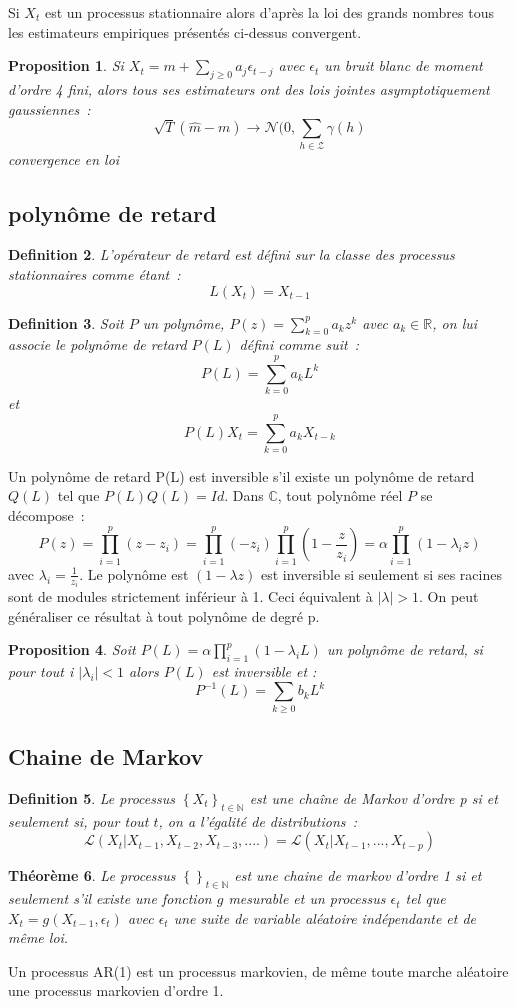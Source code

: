 \documentclass[11pt]{scrartcl} %
\newtheorem{theorem}{Théorème}[section]
\newtheorem{Def}[theorem]{Definition}
\newtheorem{pro}[theorem]{Proposition}
\begin{document}
Si $X_t$ est un processus stationnaire alors d'après la loi des grands nombres tous les estimateurs empiriques présentés ci-dessus convergent.

\begin{pro}
Si $X_t=m+\sum_{j\geq 0}a_j\epsilon_{t-j}$ avec $\epsilon_t$ un bruit blanc de moment d'ordre 4 fini, alors tous ses estimateurs ont des lois jointes asymptotiquement gaussiennes~:
$$
\sqrt{T}\left(\hat{m}-m\right)\rightarrow \mathcal{N}(0,\sum_{h\in\mathcal{Z}}\gamma(h)
$$
convergence en loi
\end{pro}
\subsection{polynôme de retard}
\begin{Def}
L'opérateur de retard est défini sur la classe des processus stationnaires comme étant~: 
$$
L(X_t)=X_{t-1}
$$
\end{Def}
\begin{Def}
Soit $P$ un polynôme, $P(z)=\sum_{k=0}^{p}a_kz^k$ avec $a_k\in\mathbb{R}$, on lui associe le polynôme de retard $P(L)$ défini comme suit~:
$$
P(L)=\sum_{k=0}^pa_kL^k
$$
et 
$$
P(L)X_t=\sum_{k=0}^pa_kX_{t-k}
$$
\end{Def}
Un polynôme de retard P(L) est inversible s'il existe un polynôme de retard $Q(L)$ tel que $P(L)Q(L)=Id$. Dans $\mathbb{C}$, tout polynôme réel $P$ se décompose~:
$$
P(z)=\prod_{i=1}^p(z-z_i)=\prod_{i=1}^p(-z_i)\prod_{i=1}^p(1-\frac{z}{z_i})=\alpha\prod_{i=1}^p(1-\lambda_i z)
$$
avec $\lambda_i=\frac{1}{z_i}$.
Le polynôme est $(1-\lambda z)$ est inversible si seulement si ses racines sont de modules strictement inférieur à 1. Ceci équivalent à $|\lambda|>1$. On peut généraliser ce résultat à tout polynôme de degré p.
\begin{pro}
Soit $P(L) = \alpha\prod_{i=1}^p(1-\lambda_i L)$ un polynôme de retard, si pour tout i $|\lambda_i|<1$ alors $P(L)$ est inversible et :
$$
P^{-1}(L)= \sum_{k\geq 0}b_kL^k
$$
\end{pro}

\subsection{Chaine de Markov}
\begin{Def}
Le processus $\left\{X_t\right\}_{t\in\mathbb{N}}$ est une chaîne de Markov d'ordre p si et seulement si, pour tout $t$, on a l'égalité de distributions~:
$$
\mathcal{L}\left(X_t|X_{t-1},X_{t-2},X_{t-3},....\right) = \mathcal{L}\left(X_t|X_{t-1},...,X_{t-p}\right)
$$
\end{Def}
\begin{theorem}
Le processus $\left\{\right\}_{t\in\mathbb{N}}$ est une chaine de markov d'ordre 1 si et seulement s'il existe une fonction $g$ mesurable et un processus $\epsilon_t$ tel que $X_t=g(X_{t-1},\epsilon_t)$ avec $\epsilon_t$ une suite de variable aléatoire indépendante et de même loi.
\end{theorem}
Un processus AR(1) est un processus markovien, de même toute marche aléatoire une processus markovien d'ordre 1.


%

\end{document}
